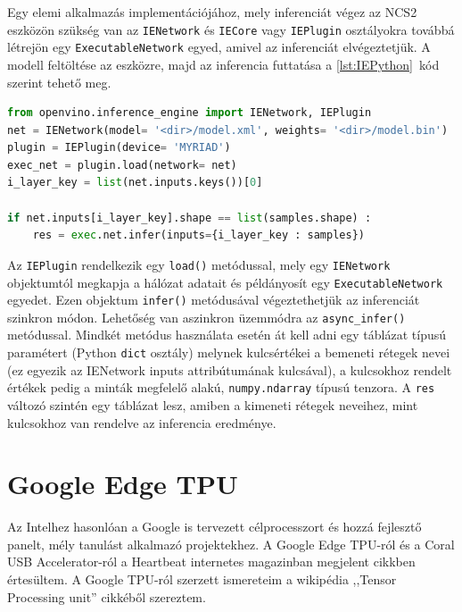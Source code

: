 Egy elemi alkalmazás implementációjához, mely inferenciát végez az NCS2 eszközön szükség van az \verb|IENetwork| és \verb|IECore| vagy \verb|IEPlugin| osztályokra továbbá létrejön egy \verb|ExecutableNetwork| egyed, amivel az inferenciát elvégeztetjük. A modell feltöltése az eszközre, majd az inferencia futtatása a \ref{lst:IEPython}~kód szerint tehető meg.
\begin{minipage}{\textwidth}
	\begin{lstlisting}[language=Python,caption=Inference Engine használata PYthon-ból ]
from openvino.inference_engine import IENetwork, IEPlugin
net = IENetwork(model= '<dir>/model.xml', weights= '<dir>/model.bin')
plugin = IEPlugin(device= 'MYRIAD')
exec_net = plugin.load(network= net)
i_layer_key = list(net.inputs.keys())[0]

if net.inputs[i_layer_key].shape == list(samples.shape) :
	res = exec.net.infer(inputs={i_layer_key : samples})
	\end{lstlisting}\label{lst:IEPython}
\end{minipage}
Az \verb|IEPlugin| rendelkezik egy \verb|load()| metódussal, mely egy \verb|IENetwork| objektumtól megkapja a hálózat adatait és példányosít egy \verb|ExecutableNetwork| egyedet. Ezen objektum \verb|infer()| metódusával végeztethetjük az inferenciát szinkron módon. Lehetőség van aszinkron üzemmódra az \verb|async_infer()| metódussal. Mindkét metódus használata esetén át kell adni egy táblázat típusú paramétert (Python \verb|dict| osztály) melynek kulcsértékei a bemeneti rétegek nevei (ez egyezik az IENetwork inputs attribútumának kulcsával), a kulcsokhoz rendelt értékek pedig a minták megfelelő alakú, \verb|numpy.ndarray| típusú tenzora. A \verb|res| változó szintén egy táblázat lesz, amiben a kimeneti rétegek neveihez, mint kulcsokhoz van rendelve az inferencia eredménye. 


\section{Google Edge TPU}
Az Intelhez hasonlóan a Google is tervezett célprocesszort és hozzá fejlesztő panelt, mély tanulást alkalmazó projektekhez. A Google Edge TPU-ról és a Coral USB Accelerator-ról a Heartbeat internetes magazinban megjelent cikkben értesültem.\cite{web:GoogleEdge} A Google TPU-ról szerzett ismereteim a wikipédia ,,Tensor Processing unit'' cikkéből szereztem.\cite{wiki:TPU}

